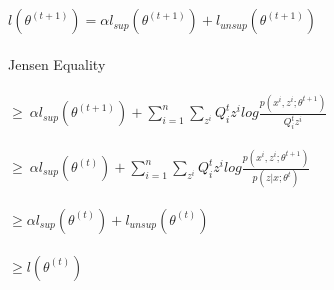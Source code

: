 \newcommand\tab[1][1cm]{\hspace*{#1}}
\begin{answer}
\\ \\
$l(\theta^{(t+1)}) = \alpha l_{sup}(\theta^{(t+1)}) +  l_{unsup}(\theta^{(t+1)})$ \\ \\
Jensen Equality \\ \\
\tab$\geq \  \alpha l_{sup}(\theta^{(t+1)}) +  \sum_{i=1}^n  \sum_{z^i} Q_i^t z^i log \frac{p(x^i,z^i;\theta^{t+1})}{Q_i^tz^i}$ \\ \\
\tab$\geq \  \alpha l_{sup}(\theta^{(t)}) +  \sum_{i=1}^n  \sum_{z^i} Q_i^t z^i log \frac{p(x^i,z^i;\theta^{t+1})}{p(z|x;\theta^t)}$ \\ \\
$\geq \alpha l_{sup}(\theta^{(t)}) +  l_{unsup}(\theta^{(t)})$\\ \\
$\geq  l(\theta^{(t)})$
\end{answer}
